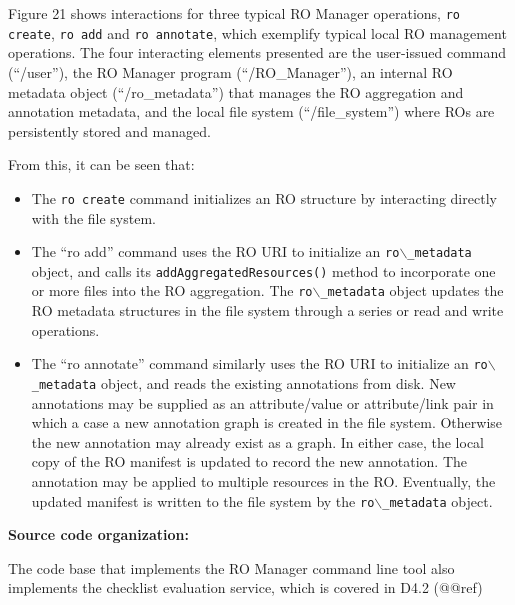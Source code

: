 \documentclass[11pt,oneside]{article}
\begin{document}
Figure 21 shows interactions for three typical RO Manager operations, \texttt{ro create}, \texttt{ro add} and
\texttt{ro annotate}, which exemplify typical local RO management operations. The four interacting elements presented are the user-issued command (``/user''), the RO Manager program (``/RO\_Manager''), an internal RO metadata object (``/ro\_metadata'') that manages the RO aggregation and annotation metadata, and the local file system (``/file\_system'') where ROs are persistently stored and managed.

From this, it can be seen that:

\begin{itemize}

\item The \texttt{ro create} command initializes an RO structure by interacting directly with the file system.


\item The ``ro add'' command uses the RO URI to initialize an \texttt{ro$\backslash$\_metadata} object, and calls its \texttt{addAggregatedResources()} method to incorporate one or more files into the RO aggregation. The \texttt{ro$\backslash$\_metadata} object updates the RO metadata structures in the file system through a series or read and write operations.


\item The ``ro annotate'' command similarly uses the RO URI to initialize an \texttt{ro$\backslash$\_metadata} object, and reads the existing annotations from disk. New annotations may be supplied as an attribute/value or attribute/link pair in which a case a new annotation graph is created in the file system. Otherwise the new annotation may already exist as a graph. In either case, the local copy of the RO manifest is updated to record the new annotation. The annotation may be applied to multiple resources in the RO. Eventually, the updated manifest is written to the file system by the \texttt{ro$\backslash$\_metadata} object.


\end{itemize}

\textbf{Source code organization:}
\label{sourcecodeorganization:}

The code base that implements the RO Manager command line tool also implements the checklist evaluation service, which is covered in D4.2 (@@ref)
\end{document}
